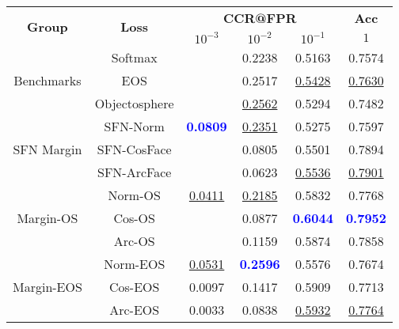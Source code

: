 \begin{tabularx}{.7\textwidth}{|c|c||ccc|c|}
\cline{1-6}
\multirow{2}{*}{\bf Group} & \multirow{2}{*}{\bf Loss} & \multicolumn{3}{c|}{\bf CCR@FPR} & \bf {Acc} \\ \cline{3-6}
& &$10^{-3}$ & $10^{-2}$ & $10^{-1}$ & $1$\\\cline{1-6}\cline{1-6}
\multirow{3}{*}{Benchmarks} & Softmax & & 0.2238 & 0.5163 & 0.7574\\
 & EOS & & 0.2517 & \underline {0.5428} & \underline {0.7630}\\
 & Objectosphere & & \underline {0.2562} & 0.5294 & 0.7482\\
\cline{1-6}
\multirow{3}{*}{SFN Margin} & SFN-Norm & \textcolor{blue}{\bf 0.0809} & \underline {0.2351} & 0.5275 & 0.7597\\
 & SFN-CosFace & & 0.0805 & 0.5501 & 0.7894\\
 & SFN-ArcFace & & 0.0623 & \underline {0.5536} & \underline {0.7901}\\
\cline{1-6}
\multirow{3}{*}{Margin-OS} & Norm-OS & \underline {0.0411} & \underline {0.2185} & 0.5832 & 0.7768\\
 & Cos-OS & & 0.0877 & \textcolor{blue}{\bf 0.6044} & \textcolor{blue}{\bf 0.7952}\\
 & Arc-OS & & 0.1159 & 0.5874 & 0.7858\\
\cline{1-6}
\multirow{3}{*}{Margin-EOS} & Norm-EOS & \underline {0.0531} & \textcolor{blue}{\bf 0.2596} & 0.5576 & 0.7674\\
 & Cos-EOS & 0.0097 & 0.1417 & 0.5909 & 0.7713\\
 & Arc-EOS & 0.0033 & 0.0838 & \underline {0.5932} & \underline {0.7764}\\
\cline{1-6}
\end{tabularx}
